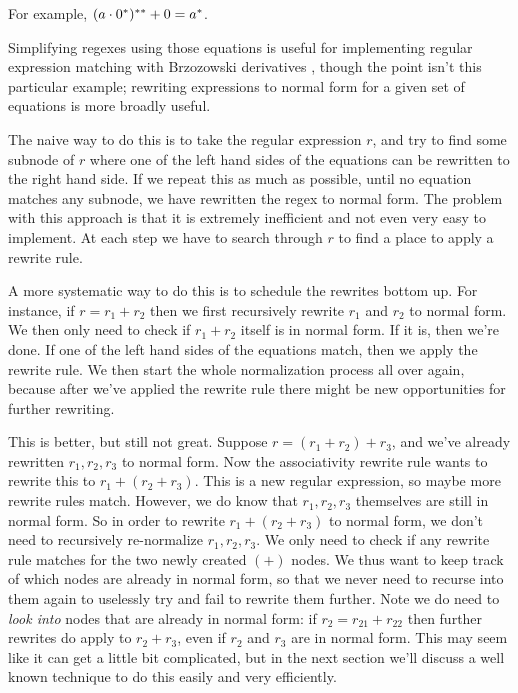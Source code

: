 \documentclass[a4paper, 11pt]{article}
\theoremstyle{definition}
\begin{document}
For example, $(a \cdot 0^*)^{**} + 0 = a^*$.

 Simplifying regexes using those equations is useful for implementing regular expression matching with Brzozowski derivatives \cite{brzozowski64,owens_reppy_turon_2009}, though the point isn't this particular example; rewriting expressions to normal form for a given set of equations is more broadly useful.

The naive way to do this is to take the regular expression $r$, and try to find some subnode of $r$ where one of the left hand sides of the equations can be rewritten to the right hand side. If we repeat this as much as possible, until no equation matches any subnode, we have rewritten the regex to normal form. The problem with this approach is that it is extremely inefficient and not even very easy to implement. At each step we have to search through $r$ to find a place to apply a rewrite rule.

A more systematic way to do this is to schedule the rewrites bottom up. For instance, if $r = r_1 + r_2$ then we first recursively rewrite $r_1$ and $r_2$ to normal form. We then only need to check if $r_1 + r_2$ itself is in normal form. If it is, then we're done. If one of the left hand sides of the equations match, then we apply the rewrite rule. We then start the whole normalization process all over again, because after we've applied the rewrite rule there might be new opportunities for further rewriting.

This is better, but still not great. Suppose $r = (r_1 + r_2) + r_3$, and we've already rewritten $r_1,r_2,r_3$ to normal form. Now the associativity rewrite rule wants to rewrite this to $r_1 + (r_2 + r_3)$. This is a new regular expression, so maybe more rewrite rules match. However, we do know that $r_1, r_2, r_3$ themselves are still in normal form. So in order to rewrite $r_1 + (r_2 + r_3)$ to normal form, we don't need to recursively re-normalize $r_1, r_2, r_3$. We only need to check if any rewrite rule matches for the two newly created $(+)$ nodes. We thus want to keep track of which nodes are already in normal form, so that we never need to recurse into them again to uselessly try and fail to rewrite them further. Note we do need to \emph{look into} nodes that are already in normal form: if $r_2 = r_{21} + r_{22}$ then further rewrites do apply to $r_2 + r_3$, even if $r_2$ and $r_3$ are in normal form. This may seem like it can get a little bit complicated, but in the next section we'll discuss a well known technique to do this easily and very efficiently.
\end{document}

